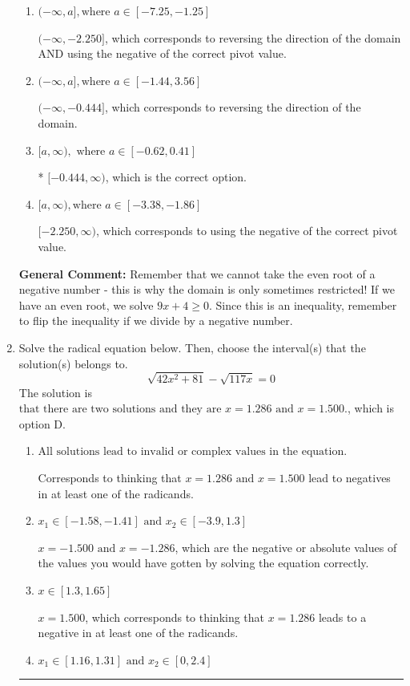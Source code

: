 \documentclass{extbook}[14pt]
\newcommand{\litem}[1]{\item #1

\rule{\textwidth}{0.4pt}}
\begin{document}
\begin{enumerate}
{\begin{enumerate}[label=\Alph*.]
This corresponds to the radical having an odd power, but the radical for this question is even.
\item \( (-\infty, a], \text{where } a \in [-7.25, -1.25] \)

$(-\infty, -2.250]$, which corresponds to reversing the direction of the domain AND using the negative of the correct pivot value.
\item \( (-\infty, a], \text{where } a \in [-1.44, 3.56] \)

 $(-\infty, -0.444]$, which corresponds to reversing the direction of the domain.
\item \( [a, \infty), \text{ where } a \in [-0.62, 0.41] \)

* $[-0.444, \infty)$, which is the correct option.
\item \( [a, \infty), \text{where } a \in [-3.38, -1.86] \)

$[-2.250, \infty)$, which corresponds to using the negative of the correct pivot value.
\end{enumerate}

\textbf{General Comment:} Remember that we cannot take the even root of a negative number - this is why the domain is only sometimes restricted! If we have an even root, we solve $9 x + 4 \geq 0$. Since this is an inequality, remember to flip the inequality if we divide by a negative number.
}
\litem{
Solve the radical equation below. Then, choose the interval(s) that the solution(s) belongs to.
\[ \sqrt{42 x^2 + 81} - \sqrt{117 x} = 0 \]The solution is \( \text{that there are two solutions and they are } x = 1.286 \text{ and } x = 1.500. \), which is option D.\begin{enumerate}[label=\Alph*.]
\item \( \text{All solutions lead to invalid or complex values in the equation.} \)

Corresponds to thinking that $x = 1.286 \text{ and } x = 1.500$ lead to negatives in at least one of the radicands.
\item \( x_1 \in [-1.58, -1.41] \text{ and } x_2 \in [-3.9,1.3] \)

$x = -1.500 \text{ and } x = -1.286$, which are the negative or absolute values of the values you would have gotten by solving the equation correctly.
\item \( x \in [1.3,1.65] \)

$x = 1.500$, which corresponds to thinking that $x = 1.286$ leads to a negative in at least one of the radicands.
\item \( x_1 \in [1.16, 1.31] \text{ and } x_2 \in [0,2.4] \)


\end{enumerate}}
\end{enumerate}
\end{document}
